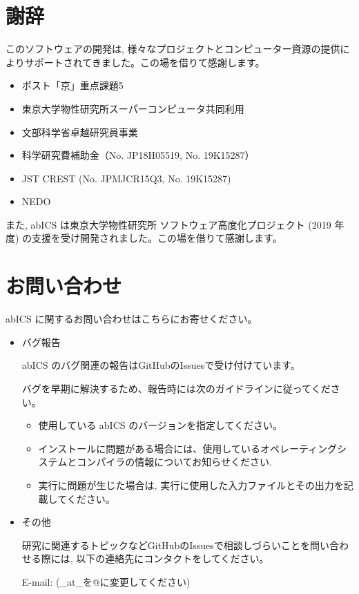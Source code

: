 \documentclass[letterpaper,10pt,dvipdfmx]{sphinxmanual}
\begin{document}
\chapter{謝辞}
\label{\detokenize{acknowledge/index::doc}}\label{\detokenize{acknowledge/index:id1}}
このソフトウェアの開発は, 様々なプロジェクトとコンピューター資源の提供によりサポートされてきました。この場を借りて感謝します。
\begin{itemize}
\item {} 
ポスト「京」重点課題5

\item {} 
東京大学物性研究所スーパーコンピュータ共同利用

\item {} 
文部科学省卓越研究員事業

\item {} 
科学研究費補助金（No. JP18H05519, No. 19K15287）

\item {} 
JST CREST (No. JPMJCR15Q3, No. 19K15287)

\item {} 
NEDO

\end{itemize}

また, abICS は東京大学物性研究所 ソフトウェア高度化プロジェクト (2019 年度) の支援を受け開発されました。この場を借りて感謝します。


\chapter{お問い合わせ}
\label{\detokenize{contact/index::doc}}\label{\detokenize{contact/index:id1}}
abICS に関するお問い合わせはこちらにお寄せください。
\begin{itemize}
\item {} 
バグ報告

abICS のバグ関連の報告はGitHubのIssuesで受け付けています。

バグを早期に解決するため、報告時には次のガイドラインに従ってください。
\begin{itemize}
\item {} 
使用している abICS のバージョンを指定してください。

\item {} 
インストールに問題がある場合には、使用しているオペレーティングシステムとコンパイラの情報についてお知らせください.

\item {} 
実行に問題が生じた場合は, 実行に使用した入力ファイルとその出力を記載してください。

\end{itemize}

\item {} 
その他

研究に関連するトピックなどGitHubのIssuesで相談しづらいことを問い合わせる際には, 以下の連絡先にコンタクトをしてください。

E-mail:  (\_at\_を@に変更してください)

\end{itemize}



\renewcommand{\indexname}{索引}
\printindex
\end{document}
